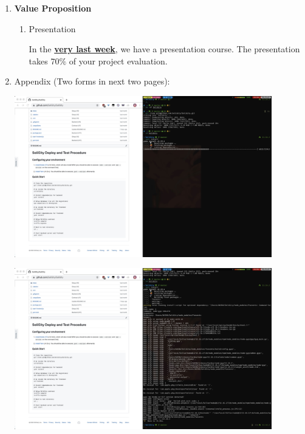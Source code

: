\documentclass[12pt]{article}
\renewcommand{\_}{\kern-1.5pt\textunderscore\kern-1.5pt}
\begin{document}
\begin{enumerate}
\begin{enumerate}
		            \vspace{\baselineskip}

	      \end{enumerate}
	      
	\item \textbf{Value Proposition}\par

	      \begin{enumerate}
		      \item Presentation\par

		            In the \textbf{\uline{very last week}}, we have a presentation course. The presentation takes 70$\%$  of your project evaluation. \par


		            \vspace{\baselineskip}

	      \end{enumerate}
	      
	\item Appendix (Two forms in next two pages):


	      \includegraphics[height=7cm]{graphs/01. git_clone}

	      \includegraphics[height=7cm]{graphs/02. yarn_install_backend}


\end{enumerate}
\end{document}
